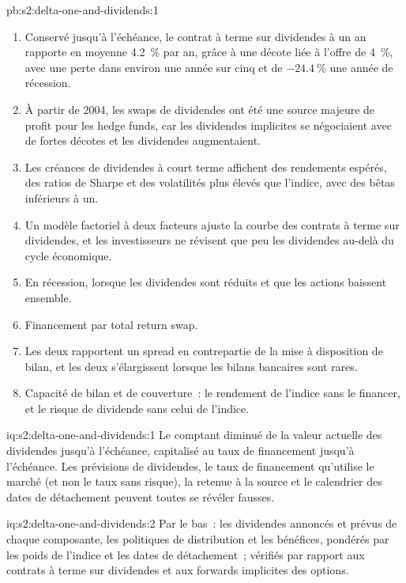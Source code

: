 \begin{solution}{pb:s2:delta-one-and-dividends:1}
\begin{enumerate}
\item Conservé jusqu'à l'échéance, le contrat à terme sur dividendes à un an rapporte en moyenne 4.2~\% par an, grâce à une décote liée à l'offre de 4~\%, avec une perte dans environ une année sur cinq
et de $-24.4~\%$ une année de récession.
\item À partir de 2004, les swaps de dividendes ont été une source majeure de profit pour les hedge funds, car les dividendes implicites se négociaient avec de fortes décotes et les dividendes augmentaient.
\item Les créances de dividendes à court terme affichent des rendements espérés, des ratios de Sharpe et des volatilités plus élevés que l'indice, avec des bêtas inférieurs à un.
\item Un modèle factoriel à deux facteurs ajuste la courbe des contrats à terme sur dividendes, et les investisseurs ne révisent que peu les dividendes au-delà du cycle économique.
\item En récession, lorsque les dividendes sont réduits et que les actions baissent ensemble.
\item Financement par total return swap.
\item Les deux rapportent un spread en contrepartie de la mise à disposition de bilan, et les deux s'élargissent lorsque les bilans bancaires sont rares.
\item Capacité de bilan et de couverture~: le rendement de l'indice sans le financer, et le risque de dividende sans celui de l'indice.
\end{enumerate}
\end{solution}

\begin{solution}{iq:s2:delta-one-and-dividends:1}
Le comptant diminué de la valeur actuelle des dividendes jusqu'à l'échéance, capitalisé au taux de financement jusqu'à l'échéance. Les prévisions de dividendes, le taux de financement qu'utilise le marché
(et non le taux sans risque), la retenue à la source et le calendrier des dates de détachement peuvent toutes se révéler fausses.
\end{solution}

\begin{solution}{iq:s2:delta-one-and-dividends:2}
Par le bas~: les dividendes annoncés et prévus de chaque composante, les politiques de distribution et les bénéfices, pondérés par les poids de l'indice et les dates de détachement~; vérifiés
par rapport aux contrats à terme sur dividendes et aux forwards implicites des options.
\end{solution}

